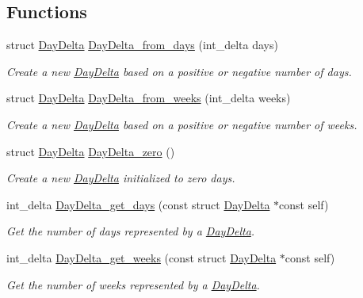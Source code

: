 \subsection*{\-Functions}
\begin{DoxyCompactItemize}
\item 
struct \hyperlink{structDayDelta}{\-Day\-Delta} \hyperlink{day-delta_8h_a50a5b111e380372e918e4d67f4b1814d}{\-Day\-Delta\-\_\-from\-\_\-days} (int\-\_\-delta days)
\begin{DoxyCompactList}\small\item\em \-Create a new \hyperlink{structDayDelta}{\-Day\-Delta} based on a positive or negative number of days. \end{DoxyCompactList}\item 
struct \hyperlink{structDayDelta}{\-Day\-Delta} \hyperlink{day-delta_8h_ac44c70541cf4f255f25384194341ff07}{\-Day\-Delta\-\_\-from\-\_\-weeks} (int\-\_\-delta weeks)
\begin{DoxyCompactList}\small\item\em \-Create a new \hyperlink{structDayDelta}{\-Day\-Delta} based on a positive or negative number of weeks. \end{DoxyCompactList}\item 
struct \hyperlink{structDayDelta}{\-Day\-Delta} \hyperlink{day-delta_8h_ab87d828518fe1bdc7e7662be3e5e6289}{\-Day\-Delta\-\_\-zero} ()
\begin{DoxyCompactList}\small\item\em \-Create a new \hyperlink{structDayDelta}{\-Day\-Delta} initialized to zero days. \end{DoxyCompactList}\item 
int\-\_\-delta \hyperlink{day-delta_8h_a1a191ca724a310625caee1f2250796d9}{\-Day\-Delta\-\_\-get\-\_\-days} (const struct \hyperlink{structDayDelta}{\-Day\-Delta} $\ast$const self)
\begin{DoxyCompactList}\small\item\em \-Get the number of days represented by a \hyperlink{structDayDelta}{\-Day\-Delta}. \end{DoxyCompactList}\item 
int\-\_\-delta \hyperlink{day-delta_8h_a20ae51668ac186eb785cbc44aec6f810}{\-Day\-Delta\-\_\-get\-\_\-weeks} (const struct \hyperlink{structDayDelta}{\-Day\-Delta} $\ast$const self)
\begin{DoxyCompactList}\small\item\em \-Get the number of weeks represented by a \hyperlink{structDayDelta}{\-Day\-Delta}. \end{DoxyCompactList}\item 

\end{DoxyCompactItemize}
